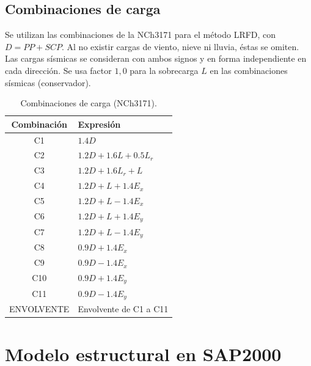 \documentclass[11pt,letterpaper]{article}
\begin{document}
\subsection{Combinaciones de carga}\label{sec:combos}
Se utilizan las combinaciones de la NCh3171 para el método LRFD, con $D = PP + SCP$. Al no existir
cargas de viento, nieve ni lluvia, éstas se omiten. Las cargas sísmicas se consideran con ambos signos
y en forma independiente en cada dirección. Se usa factor $1{,}0$ para la sobrecarga $L$ en las
combinaciones sísmicas (conservador).
\begin{table}[H]
\centering
\caption{Combinaciones de carga (NCh3171).}
\begin{tabular}{cl}
\toprule
Combinación & Expresión \\
\midrule
C1 & $1.4D$ \\
C2 & $1.2D + 1.6L + 0.5L_r$ \\
C3 & $1.2D + 1.6L_r + L$ \\
C4 & $1.2D + L + 1.4E_x$ \\
C5 & $1.2D + L - 1.4E_x$ \\
C6 & $1.2D + L + 1.4E_y$ \\
C7 & $1.2D + L - 1.4E_y$ \\
C8 & $0.9D + 1.4E_x$ \\
C9 & $0.9D - 1.4E_x$ \\
C10 & $0.9D + 1.4E_y$ \\
C11 & $0.9D - 1.4E_y$ \\
\midrule
ENVOLVENTE & Envolvente de C1 a C11 \\
\bottomrule
\end{tabular}
\end{table}

\section{Modelo estructural en SAP2000}
\end{document}
